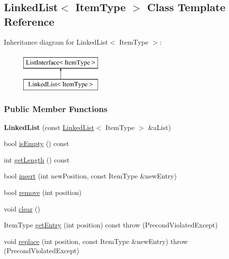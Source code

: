 \hypertarget{class_linked_list}{}\subsection{Linked\+List$<$ Item\+Type $>$ Class Template Reference}
\label{class_linked_list}
Inheritance diagram for Linked\+List$<$ Item\+Type $>$\+:\begin{figure}[H]
\begin{center}
\leavevmode
\includegraphics[height=2.000000cm]{class_linked_list}
\end{center}
\end{figure}
\subsubsection*{Public Member Functions}
\begin{DoxyCompactItemize}
\item 
\hypertarget{class_linked_list_a6f1443c6120352f1f5b6bd3c0d95e41e}{}\label{class_linked_list_a6f1443c6120352f1f5b6bd3c0d95e41e} 
{\bfseries Linked\+List} (const \hyperlink{class_linked_list}{Linked\+List}$<$ Item\+Type $>$ \&a\+List)
\item 
bool \hyperlink{class_linked_list_a008e916c3d51d28b4cc9c8cdf3e9d921}{is\+Empty} () const
\item 
int \hyperlink{class_linked_list_a61d045ef6008b494a1a516ecc992c0e7}{get\+Length} () const
\item 
bool \hyperlink{class_linked_list_ae8a19375505e87e2e4fc0e9b5afe4d4d}{insert} (int new\+Position, const Item\+Type \&new\+Entry)
\item 
bool \hyperlink{class_linked_list_a16a02716b5b2efb6fb1e3d18721b53e4}{remove} (int position)
\item 
void \hyperlink{class_linked_list_a7d1d9cf83eef67b6c4d700a3cc5970e1}{clear} ()
\item 
Item\+Type \hyperlink{class_linked_list_a341bfd7772c9d24d29eb7a7f3936915b}{get\+Entry} (int position) const  throw (\+Precond\+Violated\+Except)
\item 
void \hyperlink{class_linked_list_a3035f880c50e7d8f68e67c093d4607ca}{replace} (int position, const Item\+Type \&new\+Entry)  throw (\+Precond\+Violated\+Except)
\end{DoxyCompactItemize}

